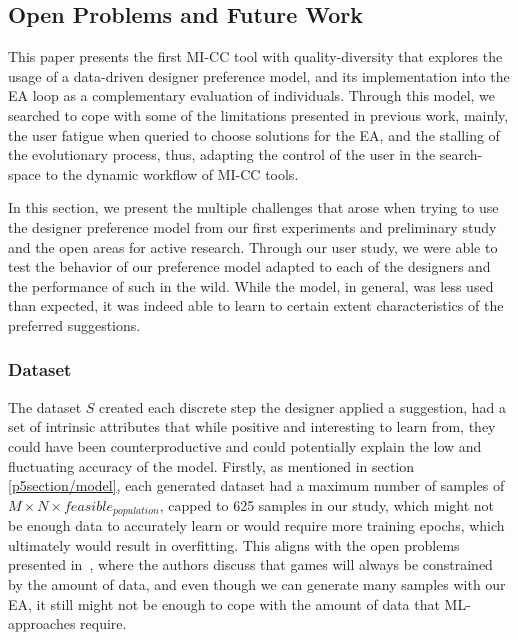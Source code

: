 \subsection{Open Problems and Future Work}


 
This paper presents the first MI-CC tool with quality-diversity that explores the usage of a data-driven designer preference model, and its implementation into the EA loop as a complementary evaluation of individuals. Through this model, we searched to cope with some of the limitations presented in previous work, mainly, the user fatigue when queried to choose solutions for the EA, and the stalling of the evolutionary process, thus, adapting the control of the user in the search-space to the dynamic workflow of MI-CC tools. 

In this section, we present the multiple challenges that arose when trying to use the designer preference model from our first experiments and preliminary study and the open areas for active research. Through our user study, we were able to test the behavior of our preference model adapted to each of the designers and the performance of such in the wild. While the model, in general, was less used than expected, it was indeed able to learn to certain extent characteristics of the preferred suggestions. 

\subsubsection{Dataset}

The dataset $S$ created each discrete step the designer applied a suggestion, had a set of intrinsic attributes that while positive and interesting to learn from, they could have been counterproductive and could potentially explain the low and fluctuating accuracy of the model. Firstly, as mentioned in section \ref{p5section/model}, each generated dataset had a maximum number of samples of $M \times N \times feasible_{population}$, capped to 625 samples in our study, which might not be enough data to accurately learn or would require more training epochs, which ultimately would result in overfitting. This aligns with the open problems presented in~, where the authors discuss that games will always be constrained by the amount of data, and even though we can generate many samples with our EA, it still might not be enough to cope with the amount of data that ML-approaches require.

